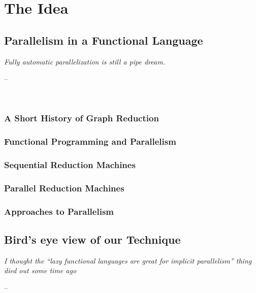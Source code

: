 \documentclass[openright, dottedtoc, headinclude, footinclude=true, a4paper, numbers=noenddot]{scrreprt}
\makeatletter
\newenvironment{chapquote}[2][2em]
  {\setlength{\@tempdima}{#1}%
   \def\chapquote@author{#2}%
   \parshape 1 \@tempdima \dimexpr\textwidth-2\@tempdima\relax%
   \itshape}
  {\par\normalfont\hfill--\ \chapquote@author\hspace*{\@tempdima}\par\noindent\hrulefill\\[1cm]}
\makeatother
\begin{document}
\part{The Idea}
\label{part:idea}

    \chapter{Parallelism in a Functional Language}
    \label{chap:background}
    \begin{chapquote}{\cite{marlowBook}}
        Fully automatic parallelization is still a pipe dream.
    \end{chapquote}
    
    
        \section{A Short History of Graph Reduction}
        \label{sec:shortHistory}
        

        \section{Functional Programming and Parallelism}
        \label{sec:FPandPar}
        
    
        \section{Sequential Reduction Machines}
        \label{sec:SequentialMachines}
        
    
        \section{Parallel Reduction Machines}
        \label{sec:ParallelMachines}
        
    
        \section{Approaches to Parallelism}
        \label{sec:Approaches}
        
        
    \chapter{Bird's eye view of our Technique}
    \label{chap:overview}
    \begin{chapquote}{\cite{benEmail}}
    I thought the ``lazy functional languages are great for implicit
    parallelism'' thing died out some time ago
    \end{chapquote}
    
\end{document}
